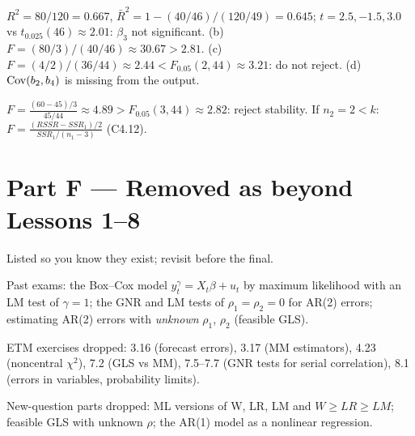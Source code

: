 \documentclass[11pt]{article}
\begin{document}
 $R^{2} = 80/120 = 0.667$, $\bar R^{2} = 1 - (40/46)/(120/49) = 0.645$;
$t = 2.5, -1.5, 3.0$ vs $t_{0.025}(46) \approx 2.01$: $\beta_{3}$ not significant.
(b) $F = (80/3)/(40/46) \approx 30.67 > 2.81$. (c) $F = (4/2)/(36/44) \approx 2.44 < F_{0.05}(2,44) \approx 3.21$:
do not reject. (d) $\operatorname{Cov}(b_{2},b_{4})$ is missing from the output.

 $F = \frac{(60 - 45)/3}{45/44} \approx 4.89 > F_{0.05}(3,44) \approx 2.82$: reject stability.
If $n_{2} = 2 < k$: $F = \frac{(RSSR - SSR_{1})/2}{SSR_{1}/(n_{1} - 3)}$ (C4.12).

\section{Part F --- Removed as beyond Lessons 1--8}

Listed so you know they exist; revisit before the final.
\begin{flatlist}
  \item Past exams: the Box--Cox model $y_{t}^{\gamma} = X_{t}\beta + u_{t}$ by maximum
        likelihood with an LM test of $\gamma = 1$; the GNR and LM tests of
        $\rho_{1} = \rho_{2} = 0$ for AR(2) errors; estimating AR(2) errors with
        \emph{unknown} $\rho_{1}$, $\rho_{2}$ (feasible GLS).
  \item ETM exercises dropped: 3.16 (forecast errors), 3.17 (MM estimators),
        4.23 (noncentral $\chi^{2}$), 7.2 (GLS vs MM), 7.5--7.7 (GNR tests for serial
        correlation), 8.1 (errors in variables, probability limits).
  \item New-question parts dropped: ML versions of W, LR, LM and $W \ge LR \ge LM$;
        feasible GLS with unknown $\rho$; the AR(1) model as a nonlinear regression.
\end{flatlist}
\end{document}
